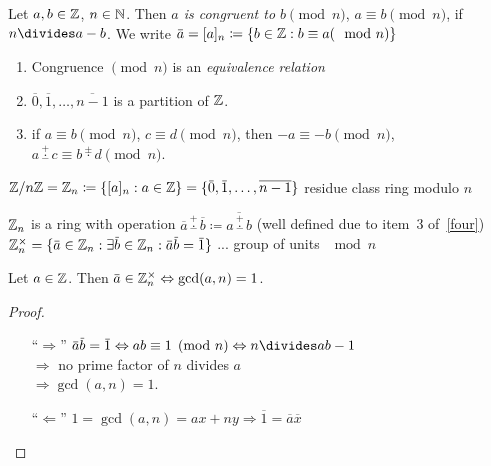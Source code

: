 \documentclass[NumTh.tex]{subfiles}
\begin{document}
\begin{defi}\label{def_0_3_1}
Let $a,b \in \mathbb{Z}$, $n \in \mathbb{N}$. Then \emph{$a$ is congruent to $b \pmod{n}$}, $a \equiv b \pmod{n}$,
if $n\divides  a-b$.
We write $\overbar{a} = [a]_n \coloneq \{b \in \Z : b \equiv a (\mod n)\}$
\end{defi}

\begin{rem}
\label{four}
\begin{enumerate}
  \item Congruence $\pmod{n}$ is an \emph{equivalence relation}
  \item $\overbar{0},\overbar{1},\dots,\overline{n-1}$ is a partition of $\mathbb{Z}$.
  \item if $a \equiv b \pmod{n}$, $c \equiv d \pmod{n}$, then 
  $-a \equiv -b \pmod{n}$,
  $a \overset{+}{\underset{-}{\cdot}} c \equiv b \overset{\pm}{\cdot} d \pmod{n}$.
\end{enumerate}
\end{rem}

\begin{defi}\label{def_0_3_2}
$\Z / n\Z = \Z_n \coloneq \{[a]_n : a\in \Z\} = \{\overbar{0},\overbar{1},\dots,\overline{n-1}\}$ residue class ring modulo $n$
\end{defi}

\begin{rem}
$\mathbb{Z}_n$ is a ring with operation $\overbar{a} \overset{+}{\underset{-}{\cdot}} \overbar{b} \coloneq \overline{a\overset{+}{\underset{-}{\cdot}}b}$ (well defined due to item~3 of~\cref{four})
$\Z_n^\times = \{ \overbar{a} \in \Z_n : \exists \overbar{b} \in \Z_n : \overbar{a}\overbar{b} = \overbar{1} \}$ ... group of units $\mod n$
\end{rem}

\begin{lemma}\label{l_0_3_3}
Let $a \in \mathbb{Z}$. Then $\overbar{a} \in \Z_n^\times \Leftrightarrow \gcd(a,n) = 1$.
\end{lemma}

\begin{proof}\hfill
\begin{itemize}
  \item[``$\Rightarrow$'']
    $\overbar{a}\overbar{b} = \overbar{1} \Leftrightarrow ab \equiv 1 \pmod{n} \Leftrightarrow n\divides ab-1$ \\
    $\Rightarrow$ no prime factor of $n$ divides $a$ \\
    $\Rightarrow \gcd(a,n) =1$.
  \item[``$\Leftarrow$'']
    $1 = \gcd(a,n) = ax + ny \Rightarrow \overbar{1} = \overbar{a}\overbar{x}$
\end{itemize}
\end{proof}
\end{document}
